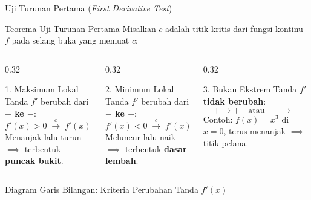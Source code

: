 \documentclass[aspectratio=43,10pt]{beamer}
\begin{document}
\begin{frame}{Uji Turunan Pertama (\textit{First Derivative Test})}
    \begin{block}{Teorema Uji Turunan Pertama}
        Misalkan $c$ adalah titik kritis dari fungsi kontinu $f$ pada selang buka yang memuat $c$:
    \end{block}

    \vspace{-0.05cm}
    \begin{columns}[T]
        \begin{column}{0.32\textwidth}
            \begin{alertblock}{1. Maksimum Lokal}
                Tanda $f'$ berubah dari \textbf{$+$ ke $-$}:
                \[
                    f'(x) > 0 \;\xrightarrow{c}\; f'(x) < 0
                \]
                {\scriptsize Menanjak lalu turun $\implies$ terbentuk \textbf{puncak bukit}.}
            \end{alertblock}
        \end{column}

        \begin{column}{0.32\textwidth}
            \begin{exampleblock}{2. Minimum Lokal}
                Tanda $f'$ berubah dari \textbf{$-$ ke $+$}:
                \[
                    f'(x) < 0 \;\xrightarrow{c}\; f'(x) > 0
                \]
                {\scriptsize Meluncur lalu naik $\implies$ terbentuk \textbf{dasar lembah}.}
            \end{exampleblock}
        \end{column}

        \begin{column}{0.32\textwidth}
            \begin{block}{3. Bukan Ekstrem}
                Tanda $f'$ \textbf{tidak berubah}:
                \[
                    +\to +\quad\text{atau}\quad -\to -
                \]
                {\scriptsize Contoh: $f(x) = x^3$ di $x=0$, terus menanjak $\implies$ titik pelana.}
            \end{block}
        \end{column}
    \end{columns}

    \vspace{-0.12cm}
    \begin{exampleblock}{Diagram Garis Bilangan: Kriteria Perubahan Tanda $f'(x)$}
        \centering
\end{exampleblock}
\end{frame}
\end{document}
